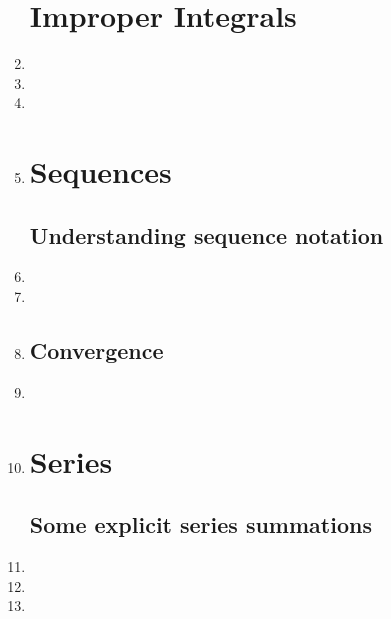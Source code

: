\documentclass{article}
\begin{document}
\begin{enumerate}
\section{Improper Integrals}
\item 

\item 
\item 

\item 

\section{Sequences}
\subsection{Understanding sequence notation}
\item 

\item 

\item 


\subsection{Convergence}
\item 

\item 

\section{Series}
\subsection{Some explicit series summations}
\item 
\item 
\item 



\end{enumerate}
\end{document}
